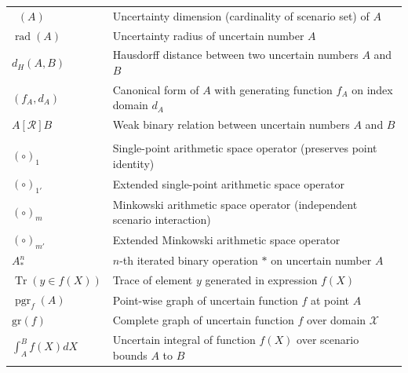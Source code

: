 \documentclass[a4paper,12pt,twoside]{memoir}
\DeclareMathOperator{\Tr}{Tr}
\DeclareMathOperator{\dimU}{\dim_U}
\DeclareMathOperator{\pgr}{pgr}
\DeclareMathOperator{\rad}{rad}
\begin{document}
\begin{table}[h!]
\begin{tabularx}{\textwidth}{@{} >{\raggedright\arraybackslash}p{3.6cm} X @{}}
			$\dimU(A)$                           & Uncertainty dimension (cardinality of scenario set) of $A$                              \\
			$\rad(A)$                            & Uncertainty radius of uncertain number $A$                                              \\
			$d_H(A, B)$                          & Hausdorff distance between two uncertain numbers $A$ and $B$                            \\
			$(f_A, d_A)$                         & Canonical form of $A$ with generating function $f_A$ on index domain $d_A$              \\
			$A[\mathcal{R}]B$                    & Weak binary relation between uncertain numbers $A$ and $B$                              \\
			\midrule
			\multicolumn{2}{@{}l}{\textit{Arithmetic Spaces \& Operations}}                                                        \\
			$(\circ)_1$                          & Single-point arithmetic space operator (preserves point identity)                       \\
			$(\circ)_{1'}$                       & Extended single-point arithmetic space operator                                         \\
			$(\circ)_m$                          & Minkowski arithmetic space operator (independent scenario interaction)                  \\
			$(\circ)_{m'}$                       & Extended Minkowski arithmetic space operator                                            \\
			$A^n_*$                              & $n$-th iterated binary operation $*$ on uncertain number $A$                            \\
			$\Tr(y \in f(X))$                    & Trace of element $y$ generated in expression $f(X)$                                     \\
			$\pgr_f(A)$                          & Point-wise graph of uncertain function $f$ at point $A$                                 \\
			$\text{gr}(f)$                       & Complete graph of uncertain function $f$ over domain $\mathcal{X}$                      \\
			$\int_{A}^{B} f(X) dX$               & Uncertain integral of function $f(X)$ over scenario bounds $A$ to $B$                   \\
			\bottomrule
		\end{tabularx}
	\end{table}
	
\end{document}
